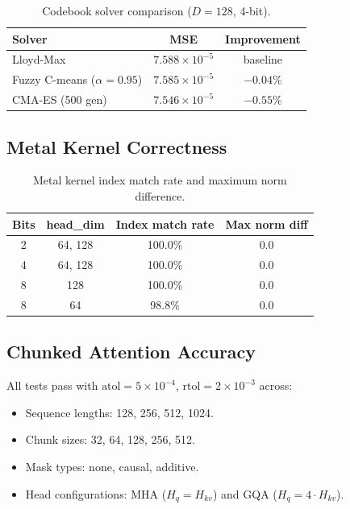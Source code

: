 \documentclass[11pt,a4paper]{article}
\begin{document}
\begin{table}[h]
\centering
\caption{Codebook solver comparison ($D=128$, 4-bit).}
\label{tab:codebook-quality}
\begin{tabular}{lcc}
\toprule
\textbf{Solver} & \textbf{MSE} & \textbf{Improvement} \\
\midrule
Lloyd-Max                  & $7.588 \times 10^{-5}$ & baseline \\
Fuzzy C-means ($\alpha=0.95$) & $7.585 \times 10^{-5}$ & $-0.04\%$ \\
CMA-ES (500 gen)           & $7.546 \times 10^{-5}$ & $\mathbf{-0.55\%}$ \\
\bottomrule
\end{tabular}
\end{table}

\subsection{Metal Kernel Correctness}

\begin{table}[h]
\centering
\caption{Metal kernel index match rate and maximum norm difference.}
\label{tab:metal-correctness}
\begin{tabular}{cccc}
\toprule
\textbf{Bits} & \textbf{head\_dim} & \textbf{Index match rate} & \textbf{Max norm diff} \\
\midrule
2 & 64, 128 & 100.0\% & 0.0 \\
4 & 64, 128 & 100.0\% & 0.0 \\
8 & 128     & 100.0\% & 0.0 \\
8 & 64      & 98.8\%  & 0.0 \\
\bottomrule
\end{tabular}
\end{table}

\subsection{Chunked Attention Accuracy}

All tests pass with $\text{atol} = 5 \times 10^{-4}$, $\text{rtol} = 2 \times 10^{-3}$ across:
\begin{itemize}
  \item Sequence lengths: 128, 256, 512, 1024.
  \item Chunk sizes: 32, 64, 128, 256, 512.
  \item Mask types: none, causal, additive.
  \item Head configurations: MHA ($H_q = H_{kv}$) and GQA ($H_q = 4 \cdot H_{kv}$).
\end{itemize}
\end{document}
